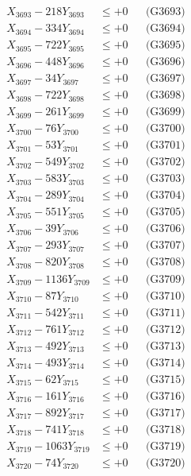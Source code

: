 \documentclass[a4paper,10pt]{article}
\begin{document}
{\begin{align}
X_{3693} - 218Y_{3693} &\leq +0 && \text{(G3693)} \\
X_{3694} - 334Y_{3694} &\leq +0 && \text{(G3694)} \\
X_{3695} - 722Y_{3695} &\leq +0 && \text{(G3695)} \\
X_{3696} - 448Y_{3696} &\leq +0 && \text{(G3696)} \\
X_{3697} - 34Y_{3697} &\leq +0 && \text{(G3697)} \\
X_{3698} - 722Y_{3698} &\leq +0 && \text{(G3698)} \\
X_{3699} - 261Y_{3699} &\leq +0 && \text{(G3699)} \\
X_{3700} - 76Y_{3700} &\leq +0 && \text{(G3700)} \\
\allowbreak
X_{3701} - 53Y_{3701} &\leq +0 && \text{(G3701)} \\
X_{3702} - 549Y_{3702} &\leq +0 && \text{(G3702)} \\
X_{3703} - 583Y_{3703} &\leq +0 && \text{(G3703)} \\
X_{3704} - 289Y_{3704} &\leq +0 && \text{(G3704)} \\
X_{3705} - 551Y_{3705} &\leq +0 && \text{(G3705)} \\
X_{3706} - 39Y_{3706} &\leq +0 && \text{(G3706)} \\
X_{3707} - 293Y_{3707} &\leq +0 && \text{(G3707)} \\
X_{3708} - 820Y_{3708} &\leq +0 && \text{(G3708)} \\
X_{3709} - 1136Y_{3709} &\leq +0 && \text{(G3709)} \\
X_{3710} - 87Y_{3710} &\leq +0 && \text{(G3710)} \\
\allowbreak
X_{3711} - 542Y_{3711} &\leq +0 && \text{(G3711)} \\
X_{3712} - 761Y_{3712} &\leq +0 && \text{(G3712)} \\
X_{3713} - 492Y_{3713} &\leq +0 && \text{(G3713)} \\
X_{3714} - 493Y_{3714} &\leq +0 && \text{(G3714)} \\
X_{3715} - 62Y_{3715} &\leq +0 && \text{(G3715)} \\
X_{3716} - 161Y_{3716} &\leq +0 && \text{(G3716)} \\
X_{3717} - 892Y_{3717} &\leq +0 && \text{(G3717)} \\
X_{3718} - 741Y_{3718} &\leq +0 && \text{(G3718)} \\
X_{3719} - 1063Y_{3719} &\leq +0 && \text{(G3719)} \\
X_{3720} - 74Y_{3720} &\leq +0 && \text{(G3720)} \\

\end{align}}
\end{document}
